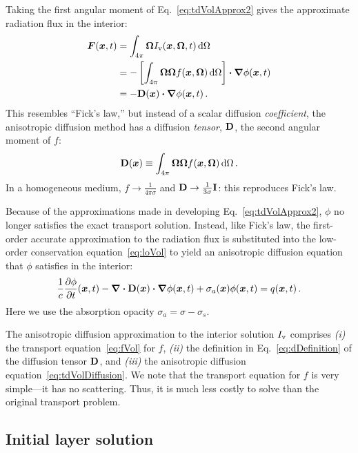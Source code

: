 Taking the first angular moment of Eq.~\eqref{eq:tdVolApprox2} gives the
approximate radiation flux in the interior:
\begin{align} \nonumber
  \bm{F}(\bm{x},t) &= \int_{4\pi} \bm{\Omega} I_\mathrm{v}(\bm{x},\bm{\Omega},t)
  \mathop{}\!\mathrm{d}\Omega
  \\ \nonumber
  &= - \left[ \int_{4\pi} \bm{\Omega} \bm{\Omega} f(\bm{x}, \bm{\Omega}) \mathop{}\!\mathrm{d}\Omega
  \right] \bm{\cdot} \bm{\nabla} \phi(\bm{x},t)
  \\ \label{eq:anisotropicFicks}
  &= - \mathbf{D}(\bm{x}) \bm{\cdot} \bm{\nabla} \phi(\bm{x},t) \,.
\end{align}
This resembles ``Fick's law,'' but instead of a scalar diffusion
\emph{coefficient},
the anisotropic diffusion method has a diffusion \emph{tensor}, $\mathbf{D}$, the
second angular moment of $f$:
\begin{equation}\label{eq:dDefinition}
  \mathbf{D}(\bm{x}) \equiv \int_{4\pi} \bm{\Omega} \bm{\Omega}
  f(\bm{x}, \bm{\Omega}) \mathop{}\!\mathrm{d}\Omega \,.
\end{equation}
In a homogeneous medium, $f\to\frac{1}{4\pi\sigma}$ and
$\mathbf{D}\to\frac{1}{3\sigma}\mathbf{I}$: this reproduces Fick's law.

Because of the approximations made in developing Eq.~\eqref{eq:tdVolApprox2},
$\phi$ no longer satisfies the exact transport solution. Instead, like Fick's
law, the first-order accurate approximation to the radiation flux is substituted
into the low-order conservation equation~\eqref{eq:loVol} to yield an
anisotropic diffusion equation that $\phi$ satisfies in the interior:
\begin{equation} \label{eq:tdVolDiffusion}
\frac{1}{c} \frac{\partial \phi}{\partial t} (\bm{x}, t)
  - \bm{\nabla} \bm{\cdot} \mathbf{D}(\bm{x}) \bm{\cdot} \bm{\nabla} \phi(\bm{x},t)
  + \sigma_a(\bm{x}) \phi(\bm{x}, t)
 = q(\bm{x},t)\,.
\end{equation}
Here we use the absorption opacity $\sigma_a = \sigma - \sigma_s$.

The anisotropic diffusion approximation to the interior solution $I_\mathrm{v}$
comprises \textsl{(i)} the transport equation~\eqref{eq:fVol} for $f$,
\textsl{(ii)} the definition in Eq.~\eqref{eq:dDefinition} of the diffusion
tensor $\mathbf{D}$, and \textsl{(iii)} the anisotropic diffusion
equation~\eqref{eq:tdVolDiffusion}. We note that the transport equation for $f$
is very simple---it has no scattering. Thus, it is much less costly to solve
than the original transport problem.

\subsection{Initial layer solution}

